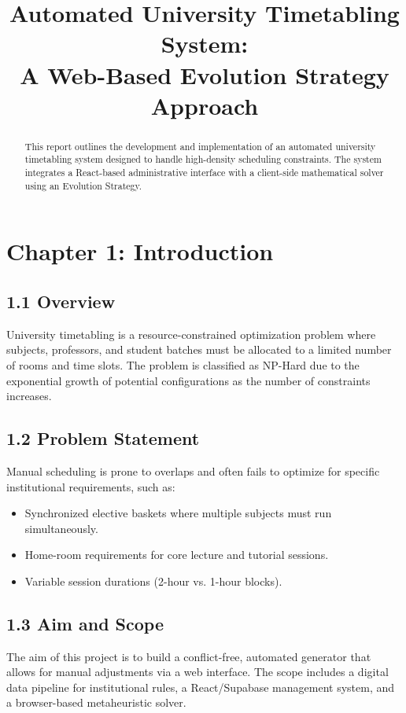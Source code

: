\documentclass{article}
\title{Automated University Timetabling System:\\ A Web-Based Evolution Strategy Approach}
\author{}
\date{}
\begin{document}
\maketitle

\begin{abstract}
This report outlines the development and implementation of an automated university timetabling system designed to handle high-density scheduling constraints. The system integrates a React-based administrative interface with a client-side mathematical solver using an Evolution Strategy.
\end{abstract}

\section*{Chapter 1: Introduction}

\subsection*{1.1 Overview}
University timetabling is a resource-constrained optimization problem where subjects, professors, and student batches must be allocated to a limited number of rooms and time slots. The problem is classified as NP-Hard due to the exponential growth of potential configurations as the number of constraints increases.

\subsection*{1.2 Problem Statement}
Manual scheduling is prone to overlaps and often fails to optimize for specific institutional requirements, such as:
\begin{itemize}
    \item Synchronized elective baskets where multiple subjects must run simultaneously.
    \item Home-room requirements for core lecture and tutorial sessions.
    \item Variable session durations (2-hour vs. 1-hour blocks).
\end{itemize}

\subsection*{1.3 Aim and Scope}
The aim of this project is to build a conflict-free, automated generator that allows for manual adjustments via a web interface. The scope includes a digital data pipeline for institutional rules, a React/Supabase management system, and a browser-based metaheuristic solver.
\end{document}
